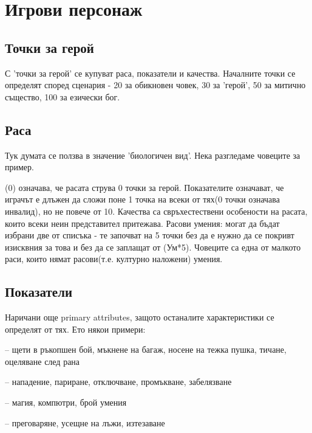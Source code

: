 
\chapter{Игрови персонаж}

\section{Точки за герой}
С 'точки за герой' се купуват раса, показатели и качества.
Началните точки се определят според сценария - 20 за обикновен човек, 30 за 'герой', 50 за митично същество, 100 за езически бог.


\section{Раса}
Тук думата се ползва в значение 'биологичен вид'.
Нека разгледаме човеците за пример.
\begin{multicols}{2}
(0) означава, че расата струва 0 точки за герой.
Показателите означават, че играчът е длъжен да сложи поне 1 точка на всеки от тях(0 точки означава инвалид), но не повече от 10.
Качества са свръхестествени особености на расата, които всеки неин представител притежава.
Расови умения: могат да бъдат избрани две от списъка - те започват на 5 точки без да е нужно да се покривт изисквния за това и без да се заплащат от (Ум*5).
Човеците са една от малкото раси, които нямат расови(т.е. културно наложени) умения.
\end{multicols}


\section{Показатели}
Наричани още primary attributes, защото останалите характеристики се определят от тях.
Ето някои примери:
\begin{itemize*}
\item {} – щети в ръкопшен бой, мъкнене на багаж, носене на тежка пушка, тичане, оцеляване след рана
\item {} – нападение, париране, отключване, промъкване, забелязване
\item {} – магия, компютри, брой умения
\item {} – преговаряне, усещне на лъжи, изтезаване
\end{itemize*}


